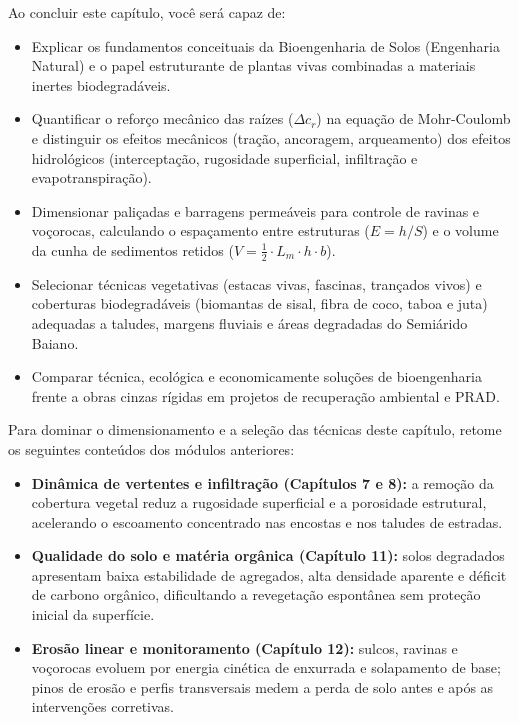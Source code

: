 \noindent\tagPratica
\vspace{4pt}

\begin{capObjetivos}
Ao concluir este capítulo, você será capaz de:
\begin{itemize}[leftmargin=1.5em, itemsep=2.5pt]
  \item Explicar os fundamentos conceituais da Bioengenharia de Solos (Engenharia Natural) e o papel estruturante de plantas vivas combinadas a materiais inertes biodegradáveis.
  \item Quantificar o reforço mecânico das raízes ($\Delta c_r$) na equação de Mohr-Coulomb e distinguir os efeitos mecânicos (tração, ancoragem, arqueamento) dos efeitos hidrológicos (interceptação, rugosidade superficial, infiltração e evapotranspiração).
  \item Dimensionar paliçadas e barragens permeáveis para controle de ravinas e voçorocas, calculando o espaçamento entre estruturas ($E = h/S$) e o volume da cunha de sedimentos retidos ($V = \frac{1}{2}\cdot L_m \cdot h \cdot b$).
  \item Selecionar técnicas vegetativas (estacas vivas, fascinas, trançados vivos) e coberturas biodegradáveis (biomantas de sisal, fibra de coco, taboa e juta) adequadas a taludes, margens fluviais e áreas degradadas do Semiárido Baiano.
  \item Comparar técnica, ecológica e economicamente soluções de bioengenharia frente a obras cinzas rígidas em projetos de recuperação ambiental e PRAD.
\end{itemize}
\end{capObjetivos}

\begin{capRevisao}
Para dominar o dimensionamento e a seleção das técnicas deste capítulo, retome os seguintes conteúdos dos módulos anteriores:
\begin{itemize}[leftmargin=1.5em, itemsep=2.5pt]
  \item \textbf{Dinâmica de vertentes e infiltração (Capítulos 7 e 8):} a remoção da cobertura vegetal reduz a rugosidade superficial e a porosidade estrutural, acelerando o escoamento concentrado nas encostas e nos taludes de estradas.
  \item \textbf{Qualidade do solo e matéria orgânica (Capítulo 11):} solos degradados apresentam baixa estabilidade de agregados, alta densidade aparente e déficit de carbono orgânico, dificultando a revegetação espontânea sem proteção inicial da superfície.
  \item \textbf{Erosão linear e monitoramento (Capítulo 12):} sulcos, ravinas e voçorocas evoluem por energia cinética de enxurrada e solapamento de base; pinos de erosão e perfis transversais medem a perda de solo antes e após as intervenções corretivas.
\end{itemize}
\end{capRevisao}

